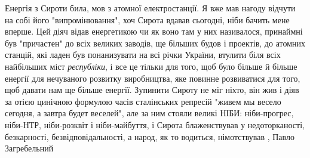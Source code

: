 Енергія з Сироти била, мов з атомної електростанції. Я вже мав нагоду відчути
на собі його "випромінювання", хоч Сирота вдавав сьогодні, ніби бачить мене
вперше. Цей діяч відав енергетикою чи як воно там у них називалося, принаймні
був "причастен" до всіх великих заводів, ще більших будов і проектів, до
атомних станцій, які ладен був понанизувати на всі річки України, втулити біля
всіх найбільших міст \emph{республіки}, і все це тільки для того, щоб було більше й
більше енергії для нечуваного розвитку виробництва, яке повинне розвиватися для
того, щоб давати нам ще більше енергії. Зупинити Сироту не міг ніхто, він жив і
діяв за отією цинічною формулою часів сталінських репресій "живем мы весело
сегодня, а завтра будет веселей", але за ним стояли великі НІБИ: ніби-прогрес,
ніби-НТР, ніби-розквіт і ніби-майбуття, і Сирота блаженствував у
недоторканості, безкарності, безвідповідальності, а народ, як то водиться,
німотствував
, Павло Загребельний 
